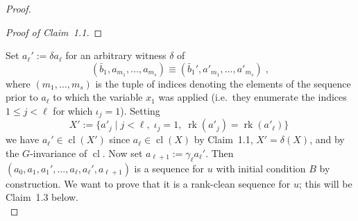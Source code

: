 \documentclass{article}
\theoremstyle{remark}
\theoremstyle{definition}
\newcommand{\remmic}[1]{\textcolor{orange}{MP: #1}}
\newcommand{\repau}[1]{\textcolor{ForestGreen}{PM: #1}}
\DeclareMathOperator{\rk}{rk}
\DeclareMathOperator{\cl}{cl}
\def\Ind#1#2{#1\setbox0=\hbox{$#1x$}\kern\wd0\hbox to 0pt{\hss$#1\mid$\hss}
	\lower.9\ht0\hbox to 0pt{\hss$#1\smile$\hss}\kern\wd0}
\def\ind{\mathop{\mathpalette\Ind{}}}
\def\Notind#1#2{#1\setbox0=\hbox{$#1x$}\kern\wd0\hbox to 0pt{\mathchardef
		\nn="3236\hss$#1\nn$\kern1.4\wd0\hss}\hbox to
	0pt{\hss$#1\mid$\hss}\lower.9\ht0
	\hbox to 0pt{\hss$#1\smile$\hss}\kern\wd0}
\def\nind{\mathop{\mathpalette\Notind{}}}
\newenvironment{subproof}[1][\proofname]{%
  \renewcommand{\qedsymbol}{$\blacksquare$}%
  \begin{proof}[#1]%
}{%
  \end{proof}%
}
\begin{document}
{\begin{proof}
\begin{subproof}[Proof of Claim~1.1]

\end{subproof}



Set $a_\ell':=\delta a_\ell$ for an arbitrary witness $\delta$ of 
\begin{equation}\label{eq:extend1}
    (\bar{b}_1,a_{m_1},\dots, a_{m_s}) %
    \equiv (\bar{b}_1',a'_{m_1},\dots, a'_{m_s}) 
    \;,
\end{equation}
where $(m_1, \dots, m_s)$ is the tuple %
of indices denoting the elements of the sequence prior to $a_\ell$ to which the variable $x_1$ was applied (i.e.~they enumerate the indices {$1\leq j < \ell$} 
for which $\iota_j=1$). Setting 
$$X':=\{a'_j\;|\; j<\ell,\; \iota_j=1,\; \rk(a'_j)=\rk(a'_\ell)\}\; $$ 
we have $a_\ell'\in {\cl}(X')$ since  $a_\ell\in {\cl}(X)$ by Claim~1.1, 
$X'=\delta(X)$, and by the $G$-invariance of ${\cl}$. 
 Now set $a_{\ell+1}:=\gamma_\ell a_\ell'$. Then $(a_0,a_1,a_1',\ldots,a_\ell,a_\ell',a_{\ell+1})$ is a sequence for $u$ with initial condition $B$ by construction. We want to prove that it is a rank-clean sequence for $u$; this will be Claim~1.3 below.\\ 
 

\end{proof}}
\end{document}
